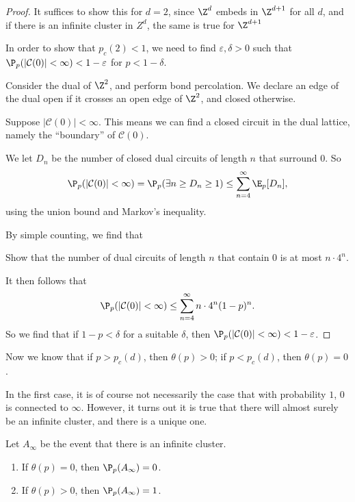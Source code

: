 \documentclass[a4paper]{article}
\begin{document}
\begin{proof}
  It suffices to show this for $d = 2$, since $\Z^d$ embeds in $\Z^{d + 1}$ for all $d$, and if there is an infinite cluster in $Z^d$, the same is true for $\Z^{d + 1}$

  In order to show that $p_c(2) < 1$, we need to find $\varepsilon, \delta > 0$ such that $\P_p(|\mathcal{C}(0)| < \infty) < 1 - \varepsilon$ for $p < 1 - \delta$.

  Consider the dual of $\Z^2$, and perform bond percolation. We declare an edge of the dual open if it crosses an open edge of $\Z^2$, and closed otherwise.

  Suppose $|\mathcal{C}(0)| < \infty$. This means we can find a closed circuit in the dual lattice, namely the ``boundary'' of $\mathcal{C}(0)$.

  We let $D_n$ be the number of closed dual circuits of length $n$ that surround $0$. So
  \[
    \P_p(|\mathcal{C}(0)| < \infty) = \P_p(\exists n \geq D_n \geq 1) \leq \sum_{n = 4}^\infty \E_p[D_n],
  \]
  using the union bound and Markov's inequality.

  By simple counting, we find that
  \begin{ex}
    Show that the number of dual circuits of length $n$ that contain $0$ is at most $n \cdot 4^n$.
  \end{ex}
  It then follows that
  \[
    \P_p(|\mathcal{C}(0)| < \infty) \leq \sum_{n = 4}^\infty n \cdot 4^n (1 - p)^n.
  \]
  So we find that if $1 - p < \delta$ for a suitable $\delta$, then $\P_p(|\mathcal{C}(0)| < \infty) < 1 - \varepsilon$.
\end{proof}

Now we know that if $p > p_c(d)$, then $\theta(p) > 0$; if $p < p_c(d)$, then $\theta(p) = 0$.

In the first case, it is of course not necessarily the case that with probability $1$, $0$ is connected to $\infty$. However, it turns out it is true that there will almost surely be an infinite cluster, and there is a unique one.

\begin{prop}
  Let $A_\infty$ be the event that there is an infinite cluster.
  \begin{enumerate}
    \item If $\theta(p) = 0$, then $\P_p(A_\infty) = 0$.
    \item If $\theta(p) > 0$, then $\P_p(A_\infty) = 1$.
  \end{enumerate}
\end{prop}
\end{document}
